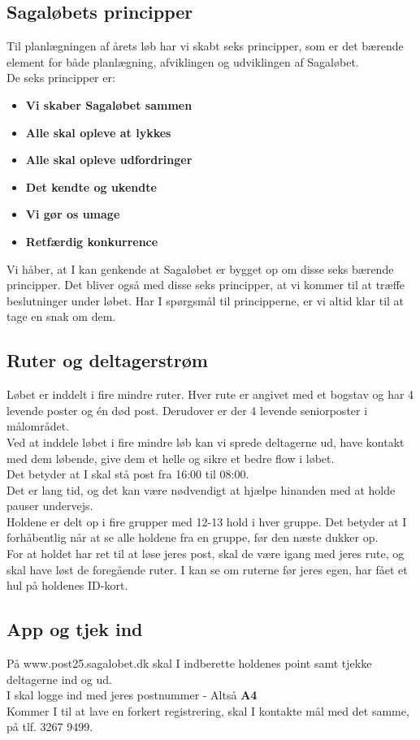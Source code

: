 \subsection{Sagaløbets principper}
Til planlægningen af årets løb har vi skabt seks principper, som er det bærende element for både planlægning, afviklingen og udviklingen af Sagaløbet.\\
De seks principper er:
\begin{itemize}
  \item \textbf{Vi skaber Sagaløbet sammen}
  \item \textbf{Alle skal opleve at lykkes}
  \item \textbf{Alle skal opleve udfordringer}
  \item \textbf{Det kendte og ukendte}
  \item \textbf{Vi gør os umage}
  \item \textbf{Retfærdig konkurrence}
\end{itemize}
Vi håber, at I kan genkende at Sagaløbet er bygget op om disse seks bærende principper. Det bliver også med disse seks principper, at vi kommer til at træffe beslutninger under løbet. Har I spørgsmål til principperne, er vi altid klar til at tage en snak om dem.
\subsection{Ruter og deltagerstrøm}
Løbet er inddelt i fire mindre ruter. Hver rute er angivet med et bogstav og har 4 levende poster og én død post. Derudover er der 4 levende seniorposter i målområdet.\\
Ved at inddele løbet i fire mindre løb kan vi sprede deltagerne ud, have kontakt med dem løbende, give dem et helle og sikre et bedre flow i løbet.\\
\newline
Det betyder at I skal stå post fra 16:00 til 08:00.\\
Det er lang tid, og det kan være nødvendigt at hjælpe hinanden med at holde pauser undervejs.\\
\newline
Holdene er delt op i fire grupper med 12-13 hold i hver gruppe. Det betyder at I forhåbentlig når at se alle holdene fra en gruppe, før den næste dukker op.\\
For at holdet har ret til at løse jeres post, skal de være igang med jeres rute, og skal have løst de foregående ruter. I kan se om ruterne før jeres egen, har fået et hul på holdenes ID-kort.
\subsection{App og tjek ind}
På www.post25.sagalobet.dk skal I indberette holdenes point samt tjekke deltagerne ind og ud.\\
I skal logge ind med jeres postnummer - Altså \textbf{A4}\\
\newline
Kommer I til at lave en forkert registrering, skal I kontakte mål med det samme, på tlf. 3267 9499.
\newpage
\vspace*{.4cm}
